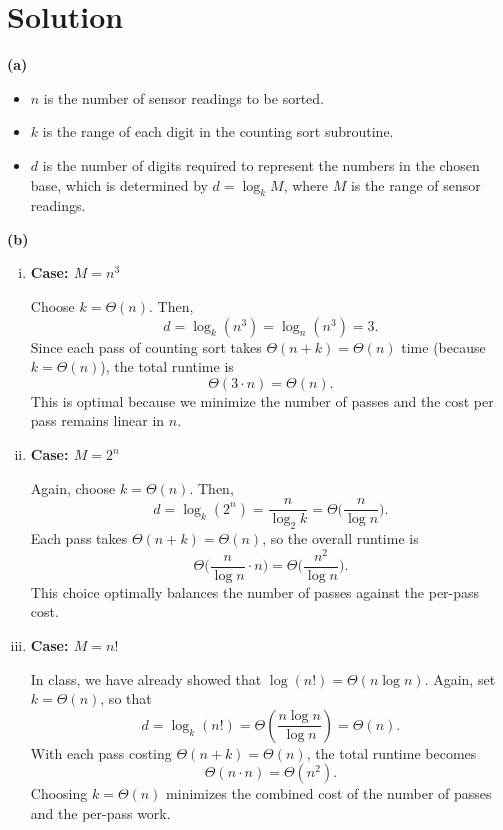\documentclass[11pt]{article}
\begin{document}
    \section*{Solution}
        \textbf{(a)}
        \begin{itemize}
            \item $n$ is the number of sensor readings to be sorted.
            \item $k$ is the range of each digit in the counting sort subroutine.
            \item $d$ is the number of digits required to represent the numbers in the chosen base, which is determined by $d = \log_k M$, where $M$ is the range of sensor readings.
        \end{itemize}
        
        \textbf{(b)}
        
        \begin{enumerate}[(i)]
            \item \textbf{Case: $M = n^3$}
        
            Choose $k = \Theta(n)$. Then,
            \[
            d = \log_k (n^3) = \log_n (n^3) = 3.
            \]
            Since each pass of counting sort takes $\Theta(n+k) = \Theta(n)$ time (because $k = \Theta(n)$), the total runtime is
            \[
            \Theta(3 \cdot n) = \Theta(n).
            \]
            This is optimal because we minimize the number of passes and the cost per pass remains linear in $n$.
            
            \item \textbf{Case: $M = 2^n$}
        
            Again, choose $k = \Theta(n)$. Then,
            \[
            d = \log_k (2^n) = \frac{n}{\log_2 k} = \Theta\!\Big(\frac{n}{\log n}\Big).
            \]
            Each pass takes $\Theta(n+k) = \Theta(n)$, so the overall runtime is
            \[
            \Theta\!\Big(\frac{n}{\log n} \cdot n\Big) = \Theta\!\Big(\frac{n^2}{\log n}\Big).
            \]
            This choice optimally balances the number of passes against the per-pass cost.
            
            \item \textbf{Case: $M = n!$}
        
            In class, we have already showed that $\log (n!) = \Theta(n\log n)$. Again, set $k = \Theta(n)$, so that
            \[
            d = \log_k (n!) = \Theta\!\left(\frac{n\log n}{\log n}\right) = \Theta(n).
            \]
            With each pass costing $\Theta(n+k) = \Theta(n)$, the total runtime becomes
            \[
            \Theta(n \cdot n) = \Theta(n^2).
            \]
            Choosing $k = \Theta(n)$ minimizes the combined cost of the number of passes and the per-pass work.
        \end{enumerate}
    
\end{document}
